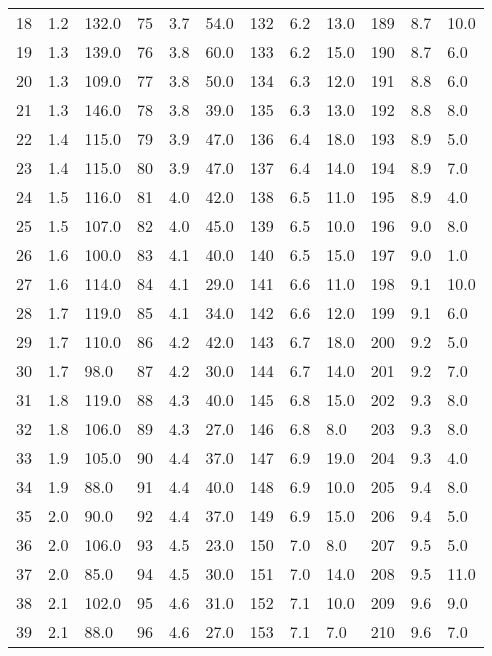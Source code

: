 \begin{table}
{\begin{tabular}{@{}lll|lll|lll|lll@{}}
     18 & 1.2 & 132.0 & 75 & 3.7 & 54.0 & 132 & 6.2 & 13.0 & 189 & 8.7 & 10.0  \\ 
     19 & 1.3 & 139.0 & 76 & 3.8 & 60.0 & 133 & 6.2 & 15.0 & 190 & 8.7 & 6.0  \\ 
     20 & 1.3 & 109.0 & 77 & 3.8 & 50.0 & 134 & 6.3 & 12.0 & 191 & 8.8 & 6.0  \\ 
     21 & 1.3 & 146.0 & 78 & 3.8 & 39.0 & 135 & 6.3 & 13.0 & 192 & 8.8 & 8.0  \\ 
     22 & 1.4 & 115.0 & 79 & 3.9 & 47.0 & 136 & 6.4 & 18.0 & 193 & 8.9 & 5.0  \\ 
     23 & 1.4 & 115.0 & 80 & 3.9 & 47.0 & 137 & 6.4 & 14.0 & 194 & 8.9 & 7.0  \\ 
     24 & 1.5 & 116.0 & 81 & 4.0 & 42.0 & 138 & 6.5 & 11.0 & 195 & 8.9 & 4.0  \\ 
     25 & 1.5 & 107.0 & 82 & 4.0 & 45.0 & 139 & 6.5 & 10.0 & 196 & 9.0 & 8.0  \\ 
     26 & 1.6 & 100.0 & 83 & 4.1 & 40.0 & 140 & 6.5 & 15.0 & 197 & 9.0 & 1.0  \\ 
     27 & 1.6 & 114.0 & 84 & 4.1 & 29.0 & 141 & 6.6 & 11.0 & 198 & 9.1 & 10.0  \\ 
     28 & 1.7 & 119.0 & 85 & 4.1 & 34.0 & 142 & 6.6 & 12.0 & 199 & 9.1 & 6.0  \\ 
     29 & 1.7 & 110.0 & 86 & 4.2 & 42.0 & 143 & 6.7 & 18.0 & 200 & 9.2 & 5.0  \\ 
     30 & 1.7 & 98.0 & 87 & 4.2 & 30.0 & 144 & 6.7 & 14.0 & 201 & 9.2 & 7.0  \\ 
     31 & 1.8 & 119.0 & 88 & 4.3 & 40.0 & 145 & 6.8 & 15.0 & 202 & 9.3 & 8.0  \\ 
     32 & 1.8 & 106.0 & 89 & 4.3 & 27.0 & 146 & 6.8 & 8.0 & 203 & 9.3 & 8.0  \\ 
     33 & 1.9 & 105.0 & 90 & 4.4 & 37.0 & 147 & 6.9 & 19.0 & 204 & 9.3 & 4.0  \\ 
     34 & 1.9 & 88.0 & 91 & 4.4 & 40.0 & 148 & 6.9 & 10.0 & 205 & 9.4 & 8.0  \\ 
     35 & 2.0 & 90.0 & 92 & 4.4 & 37.0 & 149 & 6.9 & 15.0 & 206 & 9.4 & 5.0  \\ 
     36 & 2.0 & 106.0 & 93 & 4.5 & 23.0 & 150 & 7.0 & 8.0 & 207 & 9.5 & 5.0  \\ 
     37 & 2.0 & 85.0 & 94 & 4.5 & 30.0 & 151 & 7.0 & 14.0 & 208 & 9.5 & 11.0  \\ 
     38 & 2.1 & 102.0 & 95 & 4.6 & 31.0 & 152 & 7.1 & 10.0 & 209 & 9.6 & 9.0  \\ 
     39 & 2.1 & 88.0 & 96 & 4.6 & 27.0 & 153 & 7.1 & 7.0 & 210 & 9.6 & 7.0  \\ 

\end{tabular}}
\end{table}
